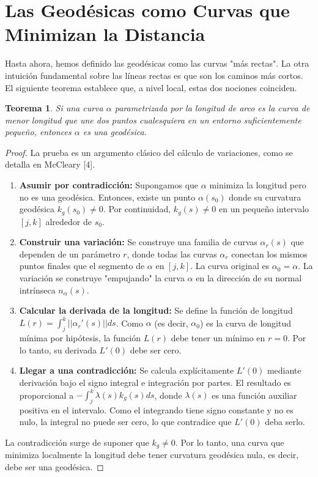 \documentclass[12pt, a4paper]{report}
\theoremstyle{miestilo}
\newtheorem{teorema}{Teorema}[chapter]
\theoremstyle{midefinicion}
\begin{document}
\section{Las Geodésicas como Curvas que Minimizan la Distancia}

Hasta ahora, hemos definido las geodésicas como las curvas "más rectas". La otra intuición fundamental sobre las líneas rectas es que son los caminos más cortos. El siguiente teorema establece que, a nivel local, estas dos nociones coinciden.

\begin{teorema}
Si una curva $\alpha$ parametrizada por la longitud de arco es la curva de menor longitud que une dos puntos cualesquiera en un entorno suficientemente pequeño, entonces $\alpha$ es una geodésica.
\end{teorema}

\begin{proof}
La prueba es un argumento clásico del cálculo de variaciones, como se detalla en McCleary [4].
\begin{enumerate}
    \item \textbf{Asumir por contradicción:} Supongamos que $\alpha$ minimiza la longitud pero no es una geodésica. Entonces, existe un punto $\alpha(s_0)$ donde su curvatura geodésica $k_g(s_0) \neq 0$. Por continuidad, $k_g(s) \neq 0$ en un pequeño intervalo $[j,k]$ alrededor de $s_0$.
    \item \textbf{Construir una variación:} Se construye una familia de curvas $\alpha_r(s)$ que dependen de un parámetro $r$, donde todas las curvas $\alpha_r$ conectan los mismos puntos finales que el segmento de $\alpha$ en $[j,k]$. La curva original es $\alpha_0 = \alpha$. La variación se construye "empujando" la curva $\alpha$ en la dirección de su normal intrínseca $n_\alpha(s)$.
    \item \textbf{Calcular la derivada de la longitud:} Se define la función de longitud $L(r) = \int_j^k ||\alpha_r'(s)|| ds$. Como $\alpha$ (es decir, $\alpha_0$) es la curva de longitud mínima por hipótesis, la función $L(r)$ debe tener un mínimo en $r=0$. Por lo tanto, su derivada $L'(0)$ debe ser cero.
    \item \textbf{Llegar a una contradicción:} Se calcula explícitamente $L'(0)$ mediante derivación bajo el signo integral e integración por partes. El resultado es proporcional a $-\int_j^k \lambda(s) k_g(s) ds$, donde $\lambda(s)$ es una función auxiliar positiva en el intervalo. Como el integrando tiene signo constante y no es nulo, la integral no puede ser cero, lo que contradice que $L'(0)$ deba serlo.
\end{enumerate}
La contradicción surge de suponer que $k_g \neq 0$. Por lo tanto, una curva que minimiza localmente la longitud debe tener curvatura geodésica nula, es decir, debe ser una geodésica.
\end{proof}
\end{document}
